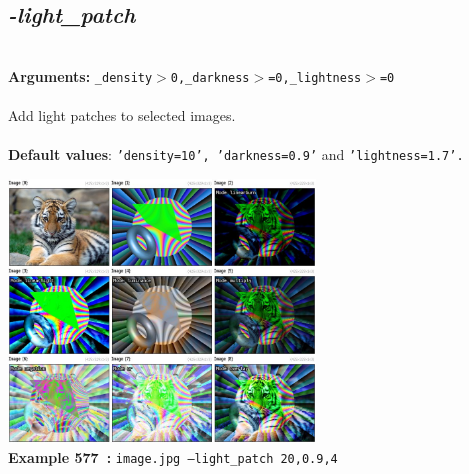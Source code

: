 \documentclass[a4paper,11pt,twoside]{book}
\begin{document}
\subsection{\emph{-light\_patch} }\vspace*{-0.5em}
~\\\textbf{Arguments: } 
{\small \texttt{\_density$>$0,\_darkness$>$=0,\_lightness$>$=0}}\\~\\
Add light patches to selected images.
~\\~\\\textbf{Default values}: {\small \texttt{'density=10', 'darkness=0.9'} and \texttt{'lightness=1.7'.}}
\begin{center}\includegraphics[keepaspectratio=true,height=7cm,width=\textwidth]{img/gmic_def577.jpg}\\
{\footnotesize \textbf{Example 577~:} \texttt{image.jpg --light\_patch 20,0.9,4}}
\end{center}
\end{document}
